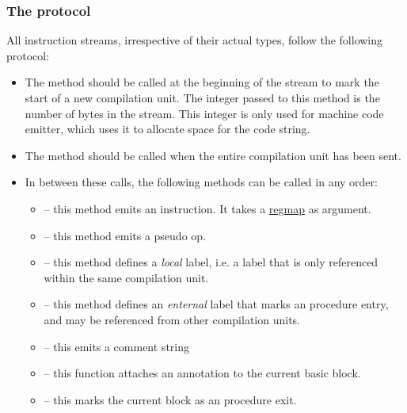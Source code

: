 \subsubsection{The protocol}
All instruction streams, irrespective of their actual types, 
follow the following protocol:
\begin{itemize}
  \item The method  should be called at the beginning of
        the stream to mark the start of a new compilation unit.  
         The integer passed to this method is the number
        of bytes in the stream.  This integer is only used for 
        machine code emitter, which uses it to allocate space for the
        code string.  
  \item The method  should be called when the entire
       compilation unit has been sent.
  \item In between these calls, the following methods can be called in any
       order:
  \begin{itemize}
   \item {} -- this method emits an instruction.  It takes
         a \href{regmap.html}{regmap} as argument.
   \item {} -- this method emits a pseudo op.
   \item {} -- this method defines a \emph{local} label, i.e.
a label that is only referenced within the same compilation unit.
   \item {} -- this method defines an \emph{enternal} label that
          marks an procedure entry, and may be referenced from other 
compilation units.
   \item {} -- this emits a comment string
   \item {} -- this function attaches an annotation to 
     the current basic block.
   \item {} -- 
          this marks the current block as an procedure exit.
  \end{itemize}
\end{itemize}  
